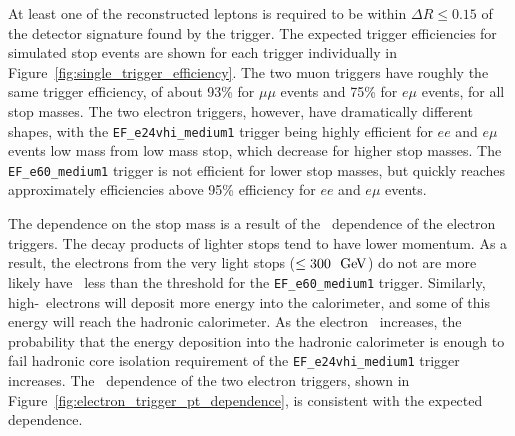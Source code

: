 \begin{table}[ht]
    \caption{Requirements for the triggers used in this analysis.  }
    \label{tab:trigger_defs}
\end{table}

At least one of the reconstructed leptons is required to be within 
$\Delta R \leq 0.15$ of the detector signature found by the trigger.
The expected trigger efficiencies for simulated stop events are shown
for each trigger individually in Figure~\ref{fig:single_trigger_efficiency}.
The two muon triggers have roughly the same trigger efficiency, of about 93\% 
for $\mu\mu$ events and 75\% for $e\mu$ events, for all stop masses.
The two electron triggers, however, have dramatically different shapes, with
the \texttt{EF\_e24vhi\_medium1} trigger being highly efficient for $ee$ and
$e\mu$ events low mass from low mass stop, which decrease for higher
stop masses. 
The \texttt{EF\_e60\_medium1} trigger is not efficient for lower stop
masses, but quickly reaches approximately efficiencies above 95\% efficiency for
$ee$ and $e\mu$ events.

The dependence on the stop mass is a result of the \ET\ dependence of the
electron triggers.
The decay products of lighter stops tend to have lower momentum.
As a result, the electrons from the very light stops ($\leq 300~\GeV$) do not 
are more likely have \ET\ less than the threshold for the
\texttt{EF\_e60\_medium1} trigger.
Similarly, high-\HT\ electrons will deposit more energy into the calorimeter,
and some of this energy will reach the hadronic calorimeter.
As the electron \HT\ increases, the probability that the energy deposition into
the hadronic calorimeter is enough to fail hadronic core isolation requirement
of the \texttt{EF\_e24vhi\_medium1} trigger increases.
The \ET\ dependence of the two electron triggers, shown in
Figure~\ref{fig:electron_trigger_pt_dependence}, is consistent with the expected
dependence.

